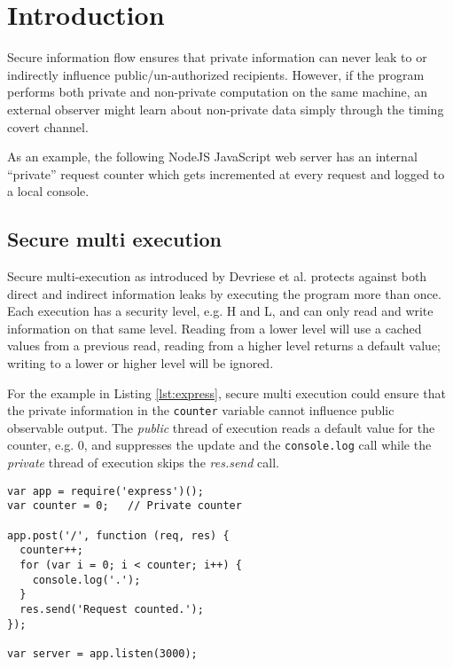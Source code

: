 \documentclass[10pt,preprint]{sigplanconf}
\title{\mytitle}
\date{}
\begin{document}
\maketitle


\section{Introduction}

Secure information flow ensures that private information can never leak to or indirectly influence public/un-authorized recipients.  However, if the program performs both private and non-private computation on the same machine, an external observer might learn about non-private data simply through the timing covert channel.

As an example, the following NodeJS JavaScript web server has an internal ``private'' request counter which gets incremented at every request and logged to a local console.

\subsection{Secure multi execution}

Secure multi-execution as introduced by Devriese et al. \cite{devriese2010} protects against both direct and indirect information leaks by executing the program more than once.  Each execution has a security level, e.g. H and L, and can only read and write information on that same level.  Reading from a lower level will use a cached values from a previous read, reading from a higher level returns a default value; writing to a lower or higher level will be ignored.

For the example in Listing \ref{lst:express}, secure multi execution could ensure that the private information in the \verb+counter+ variable cannot influence public observable output.  The \emph{public} thread of execution reads a default value for the counter, e.g. 0, and suppresses the update and the \verb+console.log+ call while the \emph{private} thread of execution skips the \emph{res.send} call.

\begin{lstlisting}[float,label=lst:express,caption={JavaScript Server Code which leaks the value of the private request counter via the timing covert channel.}]
var app = require('express')();
var counter = 0;   // Private counter

app.post('/', function (req, res) {
  counter++;
  for (var i = 0; i < counter; i++) {
    console.log('.');
  }
  res.send('Request counted.');
});

var server = app.listen(3000);
\end{lstlisting}
\end{document}
